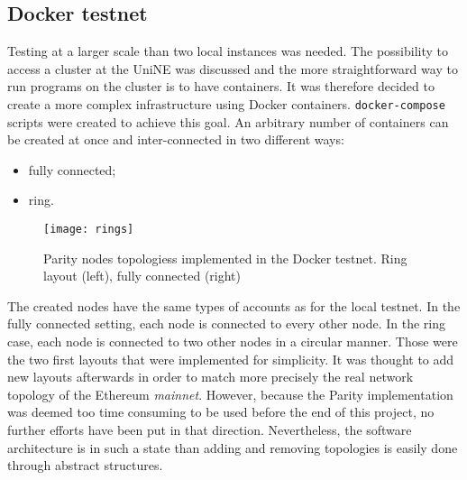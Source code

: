 \subsection{Docker testnet}
Testing at a larger scale than two local instances was needed. The possibility
to access a cluster at the UniNE was discussed and the more straightforward way
to run programs on the cluster is to have containers. It was therefore decided
to create a more complex infrastructure using Docker containers.
\texttt{docker-compose} scripts were created to achieve this goal. An arbitrary
number of containers can be created at once and inter-connected in two different
ways:
\begin{itemize}
    \item fully connected;
    \item ring.
\end{itemize}

\begin{figure}
	\centering
	\texttt{[image: rings]}
    \caption{Parity nodes topologiess implemented in the Docker testnet. Ring
    layout (left), fully connected (right)}
	\label{fig:example2}
\end{figure}

The created nodes have the same types of accounts as for the local testnet.
In the fully connected setting, each node is connected to every other node. In
the ring case, each node is connected to two other nodes in a circular manner.
Those were the two first layouts that were implemented for simplicity. It was
thought to add new layouts afterwards in order to match more precisely the real
network topology of the Ethereum \textit{mainnet}. However, because the Parity
implementation was deemed too time consuming to be used before the end of this
project, no further efforts have been put in that direction. Nevertheless, the
software architecture is in such a state than adding and removing topologies is
easily done through abstract structures.
